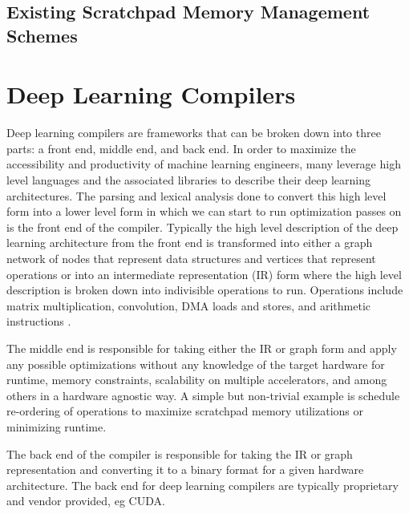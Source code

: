 \subsection{Existing Scratchpad Memory Management Schemes}

\section{Deep Learning Compilers}
Deep learning compilers are frameworks that can be broken down into three
parts: a front end, middle end, and back end. In order to maximize the
accessibility and productivity of machine learning engineers, many leverage
high level languages and the associated libraries to describe their deep
learning architectures. The parsing and lexical analysis done to convert this
high level form into a lower level form in which we can start to run
optimization passes on is the front end of the compiler. Typically the high
level description of the deep learning architecture from the front end is
transformed into either a graph network of nodes that represent data structures
and vertices that represent operations \cite{tensorflow} \cite{onsram} or into
an intermediate representation (IR) \cite{onnx} \cite{DLVM} \cite{nGraph}
form where the high level description is broken down into indivisible
operations to run. Operations include matrix multiplication, convolution, DMA
loads and stores, and arithmetic instructions \cite{tensorflow}.

The middle end is responsible for taking either the IR or graph form and apply
any possible optimizations without any knowledge of the target hardware for
runtime, memory constraints, scalability on multiple accelerators, and among
others in a hardware agnostic way. A simple but non-trivial example is schedule
re-ordering of operations to maximize scratchpad memory utilizations or minimizing
runtime.

The back end of the compiler is responsible for taking the IR or graph
representation and converting it to a binary format for a given hardware
architecture. The back end for deep learning compilers are typically
proprietary and vendor provided, eg CUDA.
